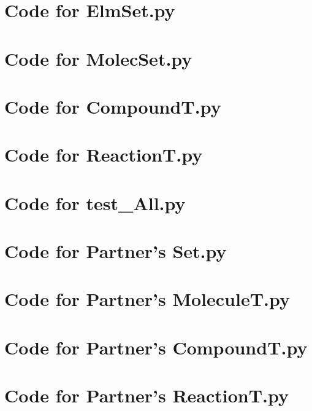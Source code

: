 \documentclass[12pt]{article}
\begin{document}
\noindent 

\newpage

\section{Code for ElmSet.py}

\noindent 

\newpage

\section{Code for MolecSet.py}

\noindent 

\newpage

\section{Code for CompoundT.py}

\noindent 

\newpage

\section{Code for ReactionT.py}

\noindent 

\newpage

\section{Code for test\_All.py}

\noindent 

\newpage

\section{Code for Partner's Set.py}

\noindent 

\newpage

\section{Code for Partner's MoleculeT.py}

\noindent 

\newpage

\section{Code for Partner's CompoundT.py}

\noindent 

\newpage

\section{Code for Partner's ReactionT.py}

\noindent 
\end{document}
